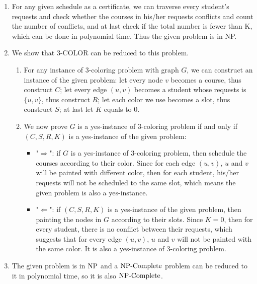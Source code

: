 \begin{enumerate}
  \item For any given schedule as a certificate, we can traverse every student's requests and check whether the courses in his/her requests conflicts and count the number of conflicts, and at last check if the total number is fewer than K, which can be done in polynomial time. Thus the given problem is in NP.
  \item We show that 3-COLOR can be reduced to this problem.
    \begin{enumerate}
      \item For any instance of 3-coloring problem with graph $G$, we can construct an instance of the given problem: let every node $v$ becomes a course, thus construct $C$; let every edge $(u,v)$ becomes a student whose requests is $\{u,v\}$, thus construct $R$; let each color we use becomes a slot, thus construct $S$; at last let $K$ equals to $0$.
      \item We now prove $G$ is a yes-instance of 3-coloring problem if and only if $(C,S,R,K)$ is a yes-instance of
        the given problem:
        \begin{itemize}
          \item "$\Rightarrow$": if $G$ is a yes-instance of 3-coloring problem, then schedule the courses according to their color. Since for each edge $(u,v)$, $u$ and $v$ will be painted with different color, then for each student, his/her requests will not be scheduled to the same slot, which means the given problem is also a yes-instance.
          \item "$\Leftarrow$": if $(C,S,R,K)$ is a yes-instance of the given problem, then painting the nodes in $G$ according to their slots. Since $K=0$, then for every student, there is no conflict between their requests, which suggests that for every edge $(u,v)$, $u$ and $v$ will not be painted with the same color. It is also a yes-instance of 3-coloring problem.
        \end{itemize}
    \end{enumerate}
  \item The given problem is in $\mathbf{\operatorname{NP}}$ and a $\mathbf{\operatorname{NP-Complete}}$ problem can be reduced to it in polynomial time, so it is also $\mathbf{\operatorname{NP-Complete}}$.
\end{enumerate}

